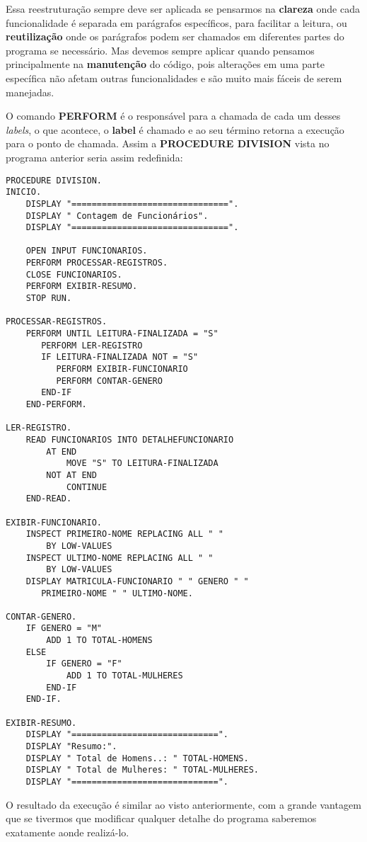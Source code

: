 Essa reestruturação sempre deve ser aplicada se pensarmos na \textbf{clareza} onde cada funcionalidade é separada em parágrafos específicos, para facilitar a leitura, ou \textbf{reutilização} onde os parágrafos podem ser chamados em diferentes partes do programa se necessário. Mas devemos sempre aplicar quando pensamos principalmente na \textbf{manutenção} do código, pois alterações em uma parte específica não afetam outras funcionalidades e são muito mais fáceis de serem manejadas.

O comando \textbf{PERFORM} é o responsável para a chamada de cada um desses \textit{labels}, o que acontece, o \textbf{label} é chamado e ao seu término retorna a execução para o ponto de chamada. Assim a \textbf{PROCEDURE DIVISION} vista no programa anterior seria assim redefinida:

\begin{lstlisting}[]
PROCEDURE DIVISION.
INICIO.
    DISPLAY "===============================".
    DISPLAY " Contagem de Funcionários".
    DISPLAY "===============================".

    OPEN INPUT FUNCIONARIOS.
    PERFORM PROCESSAR-REGISTROS.
    CLOSE FUNCIONARIOS.
    PERFORM EXIBIR-RESUMO.
    STOP RUN.

PROCESSAR-REGISTROS.
    PERFORM UNTIL LEITURA-FINALIZADA = "S"
       PERFORM LER-REGISTRO
       IF LEITURA-FINALIZADA NOT = "S"
          PERFORM EXIBIR-FUNCIONARIO
          PERFORM CONTAR-GENERO
       END-IF
    END-PERFORM.    

LER-REGISTRO. 
    READ FUNCIONARIOS INTO DETALHEFUNCIONARIO
        AT END
            MOVE "S" TO LEITURA-FINALIZADA
        NOT AT END
            CONTINUE
    END-READ.

EXIBIR-FUNCIONARIO.
    INSPECT PRIMEIRO-NOME REPLACING ALL " " 
        BY LOW-VALUES
    INSPECT ULTIMO-NOME REPLACING ALL " " 
        BY LOW-VALUES
    DISPLAY MATRICULA-FUNCIONARIO " " GENERO " "
       PRIMEIRO-NOME " " ULTIMO-NOME. 

CONTAR-GENERO.
    IF GENERO = "M"
        ADD 1 TO TOTAL-HOMENS
    ELSE
        IF GENERO = "F"
            ADD 1 TO TOTAL-MULHERES
        END-IF
    END-IF.

EXIBIR-RESUMO.
    DISPLAY "=============================".
    DISPLAY "Resumo:".
    DISPLAY " Total de Homens..: " TOTAL-HOMENS.
    DISPLAY " Total de Mulheres: " TOTAL-MULHERES.
    DISPLAY "=============================".
\end{lstlisting}

O resultado da execução é similar ao visto anteriormente, com a grande vantagem que se tivermos que modificar qualquer detalhe do programa saberemos exatamente aonde realizá-lo.